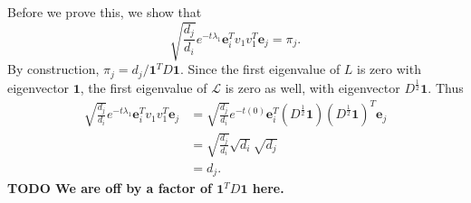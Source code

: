 \documentclass{article}
\newcommand{\todo}[1]{\textbf{TODO #1}}
\newcommand{\1}{\mathbf{1}}
\newcommand{\0}{\mathbf{0}}
\newcommand{\e}{\mathbf{e}}
\renewcommand{\L}{\mathcal{L}}
\begin{document}
\begin{enumerate}
\begin{enumerate}
    Before we prove this, we show that
    \begin{equation*}
      \sqrt{\frac{d_j}{d_i}} e^{-t \lambda_1} \e_i^T v_1 v_1^T \e_j = \pi_j.
    \end{equation*}
    By construction, $\pi_j = d_j / \1^T D \1$.
    Since the first eigenvalue of $L$ is zero with eigenvector $\1$, the first eigenvalue of $\L$ is zero as well, with eigenvector $D^{\frac{1}{2}} \1$.
    Thus
    \begin{align*}
      \sqrt{\frac{d_j}{d_i}} e^{-t \lambda_1} \e_i^T v_1 v_1^T \e_j & = \sqrt{\frac{d_j}{d_i}} e^{-t (0)} \e_i^T (D^{\frac{1}{2}} \1) (D^{\frac{1}{2}} \1)^T \e_j \\
      & = \sqrt{\frac{d_j}{d_i}} \sqrt{d_i} \sqrt{d_j} \\
      & = d_j.
    \end{align*}
    \todo{We are off by a factor of $\1^T D \1$ here.}


\end{enumerate}
\end{enumerate}
\end{document}
